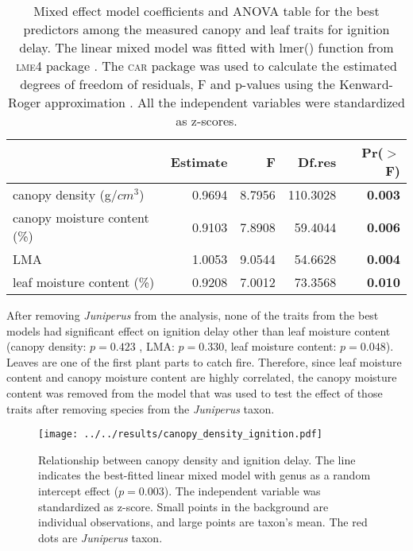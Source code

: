 \documentclass{ttuthes2007}
\newcommand{\pkg}[1]{\textsc{#1}}
\begin{document}
\begin{table}[ht]
  \centering
  \caption{Mixed effect model coefficients and ANOVA table for the best
    predictors among the measured canopy and leaf traits for ignition delay.
    The linear mixed model was fitted with lmer() function from \pkg{lme4}
    package \citep{bates2009package}. The \pkg{car} package
    \citep{fox2013hypothesis} was used to calculate the estimated degrees of
    freedom of residuals, F and p-values using the Kenward-Roger approximation
    \citep{kenward1997small}. All the independent variables were standardized
    as z-scores.}
  \begin{tabular}{lrrrr}
    \toprule
    & Estimate & F & Df.res & Pr($>$F) \\ 
    \midrule
    canopy density (g/{$cm^3$}) & 0.9694 & 8.7956  & 110.3028 & \textbf{0.003} \\ 
    canopy moisture content (\%) & 0.9103 & 7.8908 & 59.4044 & \textbf{0.006} \\ 
    LMA & 1.0053 & 9.0544  & 54.6628 & \textbf{0.004} \\  
    leaf moisture content (\%) & 0.9208 & 7.0012  & 73.3568 & \textbf{0.010} \\ 
    \bottomrule
  \end{tabular}
  \label{tab:fandpforig_delay}
\end{table}

\noindent After removing \emph{Juniperus} from the analysis, %
none of the traits from the best models had significant effect on ignition delay other than leaf moisture content (canopy density: $p = 0.423$ , 
LMA: $p = 0.330$, leaf moisture content: $p = 0.048$). Leaves are one of the first plant parts to catch fire. Therefore, since leaf moisture content and canopy moisture content are highly correlated, the canopy moisture content was removed from the model that was used to test the effect of those traits after removing species from the \emph{Juniperus} taxon.






\begin{figure}[ht]
    \centering
    \texttt{[image: ../../results/canopy\_density\_ignition.pdf]}
    \caption[Canopy density effect on ignition delay]{\label{fig:canopy_density_ig_delay} Relationship between canopy density and ignition delay. The line indicates the best-fitted linear mixed model with genus as a random intercept effect ($p  = 0.003$). The independent variable was standardized  as z-score. Small points in the background are individual observations, and large points are taxon's mean. The red dots are \emph{Juniperus} taxon.}
\end{figure}
\end{document}
